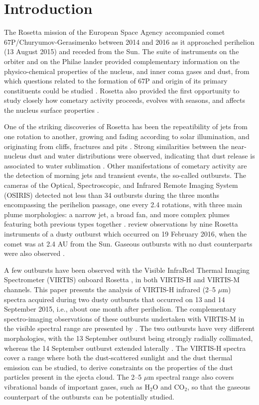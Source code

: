 \documentclass[a4paper,fleqn,usenatbib]{mnras}
\begin{document}
\section{Introduction}

The Rosetta mission of the European Space Agency accompanied comet 67P/Churyumov-Gerasimenko between 2014 and 2016 as it approached perihelion (13 August 2015) and receded from the Sun. The suite of instruments on the orbiter and on the Philae lander
provided complementary information on the physico-chemical properties of the nucleus, and inner coma gases and dust, from which questions related to the formation of 67P and origin of its primary constituents could be studied \citep{Davidsson2016,Fulle2016}. Rosetta also provided the first opportunity to study closely how cometary activity proceeds, evolves with seasons, and affects the nucleus surface properties \citep{El-Maary2017}.

One of the striking discoveries of Rosetta has been the repeatibility of jets from one rotation to another, growing and fading according to solar illumination, and originating from cliffs, fractures and pits \citep{Vincent2016a}. Strong similarities  between the near-nucleus dust and water distributions were observed, indicating that dust release is associated to water sublimation \citep{Rinaldi2016,Fink2016}. Other manifestations of cometary activity are the detection of morning jets \citep{Shi2016} and transient events, the so-called outbursts. The cameras of the Optical, Spectroscopic, and Infrared Remote Imaging System (OSIRIS) detected not less than 34 outbursts during the three months encompassing the perihelion passage, one every 2.4 rotations, with three main plume morphologies: a narrow jet, a broad fan, and more complex plumes featuring both previous types together \citep{Vincent2016b}. \citet{Gruen2016} review observations by nine Rosetta instruments of a dusty outburst which occurred on 19 February 2016, when the comet was at 2.4 AU from the Sun. Gaseous outbursts with no dust counterparts were also observed \citep{Feldman2016}.



A few outbursts have been observed with the Visible InfraRed Thermal Imaging
Spectrometer (VIRTIS) onboard Rosetta \citep{Coradini2007}, in both VIRTIS-H and VIRTIS-M channels. This paper presents the analysis of VIRTIS-H infrared  (2--5 $\mu$m) spectra  acquired during two dusty outbursts that occurred on 13 and 14 September 2015, i.e., about one month after perihelion.
The complementary spectro-imaging observations of these outbursts undertaken with VIRTIS-M in the visible spectral range are presented by \citet{Rinaldi2017}. The two outbursts have very different morphologies, with the 13 September outburst being strongly radially collimated, whereas the 14 September outburst extended laterally \citep{Rinaldi2017}. The VIRTIS-H spectra cover a range where both the dust-scattered sunlight and the dust thermal emission can be studied, to derive constraints on the properties of the dust particles present in the ejecta cloud. The 2--5 $\mu$m spectral range also covers vibrational bands of important gases, such as H$_2$O and CO$_2$, so that the gaseous counterpart of the outbursts can be potentially studied.
\end{document}
